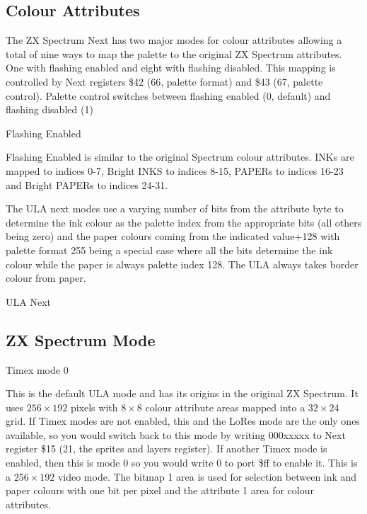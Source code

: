 \subsection{Colour Attributes}
The ZX Spectrum Next has two major modes for colour attributes
allowing a total of nine ways to map the palette to the original ZX
Spectrum attributes. One with flashing enabled and eight with flashing
disabled. This mapping is controlled by Next registers \$42 (66,
palette format) and \$43 (67, palette control).  Palette control
switches between flashing enabled (0, default) and flashing disabled
(1)

\begin{table}[h]\centering
  \caption{Flashing Enabled}
\end{table}

Flashing Enabled is similar to the original Spectrum colour
attributes. INKs are mapped to indices 0-7, Bright INKS to indices
8-15, PAPERs to indices 16-23 and Bright PAPERs to indices 24-31.

The ULA next modes use a varying number of bits from the attribute
byte to determine the ink colour as the palette index from the
appropriate bits (all others being zero) and the paper colours coming
from the indicated value+128 with palette format 255 being a special
case where all the bits determine the ink colour while the paper is
always palette index 128. The ULA always takes border colour from paper.

\begin{table}[h]\centering
  \caption{ULA Next}
\end{table}

\subsection{ZX Spectrum Mode}

Timex mode 0

This is the default ULA mode and has its origins in the original ZX
Spectrum. It uses $256\times192$ pixels with $8\times8$ colour
attribute areas mapped into a $32\times24$ grid. If Timex modes are
not enabled, this and the LoRes mode are the only ones available, so
you would switch back to this mode by writing 000xxxxx to Next
register \$15 (21, the sprites and layers register). If another Timex
mode is enabled, then this is mode 0 so you would write 0 to port \$ff
to enable it. This is a $256\times192$ video mode. The bitmap 1 area
is used for selection between ink and paper colours with one bit per
pixel and the attribute 1 area for colour attributes.

